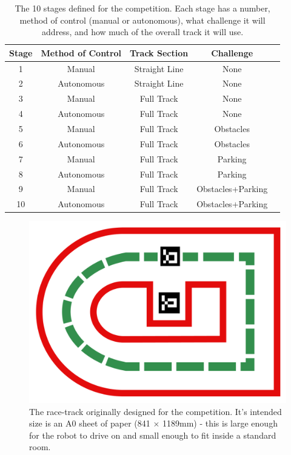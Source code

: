 \documentclass{l4proj}
\begin{document}
\begin{appendices}
\begin{table}[!h]
    \centering
    \caption{The 10 stages defined for the competition. Each stage has a number, method of control (manual or autonomous), what challenge it will address, and how much of the overall track it will use.}
    \label{tab:stages}
    \begin{tabular}{@{}|c|c|c|c|c|@{}}
        \toprule
        \multicolumn{1}{|c|}{\textbf{Stage}} & \multicolumn{1}{c|}{\textbf{Method of Control}} & \multicolumn{1}{c|}{\textbf{Track Section}} & \multicolumn{1}{c|}{\textbf{Challenge}} \\ \midrule
        1 & Manual & Straight Line & None \\
        2 & Autonomous & Straight Line & None \\
        3 & Manual & Full Track & None \\
        4 & Autonomous & Full Track & None \\
        5 & Manual & Full Track & Obstacles \\
        6 & Autonomous & Full Track & Obstacles \\
        7 & Manual & Full Track & Parking \\
        8 & Autonomous & Full Track & Parking \\
        9 & Manual & Full Track & Obstacles+Parking \\
        10 & Autonomous & Full Track & Obstacles+Parking \\
        \bottomrule
    \end{tabular}
\end{table}


\begin{figure}[!h]
    \centering
    \includegraphics[width=0.5\linewidth]{images/final_track_design.png}
    \caption{The race-track originally designed for the competition. It's intended size is an A0 sheet of paper (841 $\times$ 1189mm) - this is large enough for the robot to drive on and small enough to fit inside a standard room.}
    \label{fig:track-design}
\end{figure}



\end{appendices}
\end{document}

